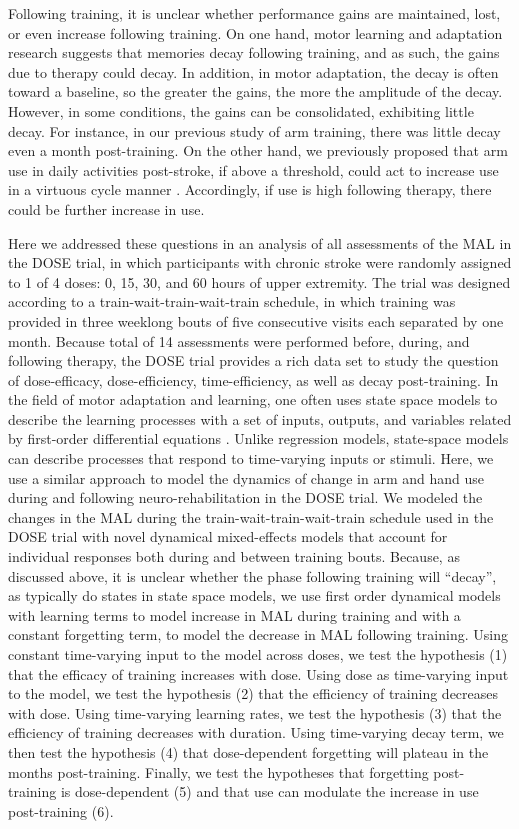 Following training, it is unclear whether performance gains are maintained, lost, or even increase following training.
On one hand, motor learning and adaptation research suggests that memories decay following training, and as such, the gains due to therapy could decay. 
In addition, in motor adaptation, the decay is often toward a baseline, so the greater the gains, the more the amplitude of the decay. 
However, in some conditions, the gains can be consolidated, exhibiting little decay. 
For instance, in our previous study of arm training, there was little decay even a month post-training. 
On the other hand, we previously proposed that arm use in daily activities post-stroke, if above a threshold, could act to increase use in a virtuous cycle manner \cite{Hidaka2012, Schweighofer2009}. 
Accordingly, if use is high following therapy, there could be further increase in use. 

Here we addressed these questions in an analysis of all assessments of the MAL in the DOSE trial, in which participants with chronic stroke were randomly assigned to 1 of 4 doses: 0, 15, 30, and 60 hours of upper extremity.
The trial was designed according to a train-wait-train-wait-train schedule, in which training was provided in three weeklong bouts of five consecutive visits each separated by one month. 
Because total of 14 assessments were performed before, during, and following therapy, the DOSE trial provides a rich data set to study the question of dose-efficacy, dose-efficiency, time-efficiency, as well as decay post-training. 
In the field of motor adaptation and learning, one often uses state space models to describe the learning processes with a set of inputs, outputs, and variables related by first-order differential equations \cite{Smith2006, Lee2009}. 
Unlike regression models, state-space models can describe processes that respond to time-varying inputs or stimuli. 
Here, we use a similar approach to model the dynamics of change in arm and hand use during and following neuro-rehabilitation in the DOSE trial. 
We modeled the changes in the MAL during the train-wait-train-wait-train schedule used in the DOSE trial with novel dynamical mixed-effects models that account for individual responses both during and between training bouts. 
Because, as discussed above, it is unclear whether the phase following training will “decay”, as typically do states in state space models, we use first order dynamical models with learning terms to model increase in MAL during training and with a constant forgetting term, to model the decrease in MAL following training. 
Using constant time-varying input to the model across doses, we test the hypothesis (1) that the efficacy of training increases with dose. 
Using dose as time-varying input to the model, we test the hypothesis (2) that the efficiency of training decreases with dose. 
Using time-varying learning rates, we test the hypothesis (3) that the efficiency of training decreases with duration. 
Using time-varying decay term, we then test the hypothesis (4) that dose-dependent forgetting will plateau in the months post-training. 
Finally, we test the hypotheses that forgetting post-training is dose-dependent (5) and that use can modulate the increase in use post-training (6). 



